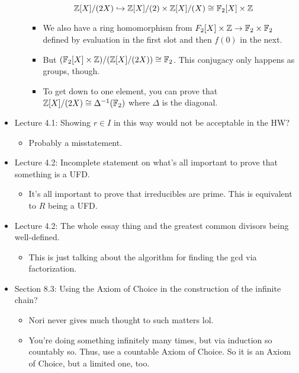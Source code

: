 \documentclass[../notes.tex]{subfiles}
\begin{document}
\begin{itemize}
\begin{itemize}
        \begin{equation*}
            \mathbb{Z}[X]/(2X) \hookrightarrow \mathbb{Z}[X]/(2)\times\mathbb{Z}[X]/(X)
            \cong \mathbb{F}_2[X]\times\mathbb{Z}
        \end{equation*}
        \begin{itemize}
            \item We also have a ring homomorphism from $F_2[X]\times\mathbb{Z}\to\mathbb{F}_2\times\mathbb{F}_2$ defined by evaluation in the first slot and then $f(0)$ in the next.
            \item But $(\mathbb{F}_2[X]\times\mathbb{Z})/(\mathbb{Z}[X]/(2X))\cong\mathbb{F}_2$. This conjugacy only happens as groups, though.
            \item To get down to one element, you can prove that $\mathbb{Z}[X]/(2X)\cong\Delta^{-1}(\mathbb{F}_2)$ where $\Delta$ is the diagonal.
        \end{itemize}
    \end{itemize}
    \item Lecture 4.1: Showing $r\in I$ in this way would not be acceptable in the HW?
    \begin{itemize}
        \item Probably a misstatement.
    \end{itemize}
    \item Lecture 4.2: Incomplete statement on what's all important to prove that something is a UFD.
    \begin{itemize}
        \item It's all important to prove that irreducibles are prime. This is equivalent to $R$ being a UFD.
    \end{itemize}
    \item Lecture 4.2: The whole essay thing and the greatest common divisors being well-defined.
    \begin{itemize}
        \item This is just talking about the algorithm for finding the gcd via factorization.
    \end{itemize}
    \item Section 8.3: Using the Axiom of Choice in the construction of the infinite chain?
    \begin{itemize}
        \item Nori never gives much thought to such matters lol.
        \item You're doing something infinitely many times, but via induction so countably so. Thus, use a countable Axiom of Choice. So it is an Axiom of Choice, but a limited one, too.
    \end{itemize}

\end{itemize}
\end{document}
